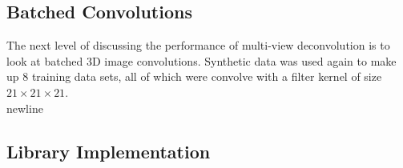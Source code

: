 \clearpage
\subsection{Batched Convolutions}

The next level of discussing the performance of multi-view deconvolution is to look at batched 3D image convolutions. Synthetic data was used again to make up 8 training data sets, all of which were convolve with a filter kernel of size $21 \times 21 \times 21$.\\newline 


\clearpage
\subsection{Library Implementation}


